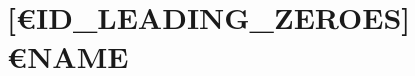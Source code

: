 \documentclass[../list/inventory_full.tex]{subfiles}
\begin{document}

\section*{[€{ID_LEADING_ZEROES}] €{NAME}}
\end{document}
